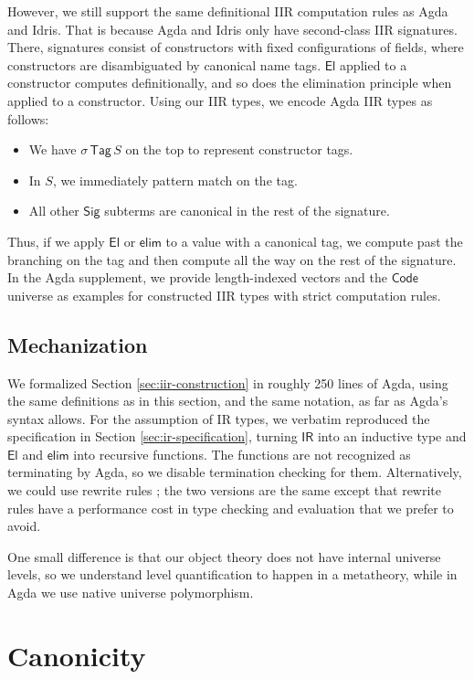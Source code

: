 \documentclass[acmsmall,screen,review]{acmart}
\newcommand{\msf}[1]{{\mathsf{#1}}}
\newcommand{\El}{\msf{El}}
\newcommand{\Sig}{\msf{Sig}}
\newcommand{\Code}{\msf{Code}}
\newcommand{\Tag}{\msf{Tag}}
\newcommand{\IR}{\msf{IR}}
\newcommand{\elim}{\msf{elim}}
\begin{document}
However, we still support the same definitional IIR computation rules as Agda and Idris. That is
because Agda and Idris only have second-class IIR signatures. There, signatures consist of
constructors with fixed configurations of fields, where constructors are disambiguated by canonical
name tags. $\El$ applied to a constructor computes definitionally, and so does the elimination
principle when applied to a constructor. Using our IIR types, we encode Agda IIR types as follows:
\begin{itemize}
\item We have $\sigma\,\Tag\,S$ on the top to represent constructor tags.
\item In $S$, we immediately pattern match on the tag.
\item All other $\Sig$ subterms are canonical in the rest of the signature.
\end{itemize}
Thus, if we apply $\El$ or $\elim$ to a value with a canonical tag, we compute past the branching on
the tag and then compute all the way on the rest of the signature. In the Agda supplement, we provide
length-indexed vectors and the $\Code$ universe as examples for constructed IIR types with strict
computation rules.

\subsection{Mechanization}

We formalized Section \ref{sec:iir-construction} in roughly 250 lines of Agda, using the same
definitions as in this section, and the same notation, as far as Agda's syntax allows. For the
assumption of IR types, we verbatim reproduced the specification in Section \ref{sec:ir-specification},
turning $\IR$ into an inductive type and $\El$ and $\elim$ into recursive functions. The functions
are not recognized as terminating by Agda, so we disable termination checking for
them. Alternatively, we could use rewrite rules \cite{DBLP:journals/pacmpl/CockxTW21}; the two
versions are the same except that rewrite rules have a performance cost in type checking and
evaluation that we prefer to avoid.

One small difference is that our object theory does not have internal universe levels, so we
understand level quantification to happen in a metatheory, while in Agda we use native universe
polymorphism.

\section{Canonicity}\label{sec:canonicity}
\end{document}
